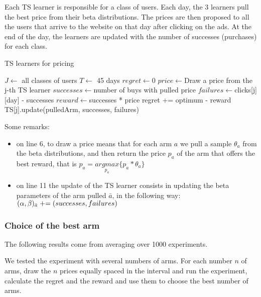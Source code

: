 Each TS learner is responsible for a class of users. Each day, the 3 learners pull the best price from their beta distributions. The prices are then proposed to all the users that arrive to the website on that day after clicking on the ads. At the end of the day, the learners are updated with the number of successes (purchases) for each class.

\begin{algorithm}
    \caption{TS learners for pricing}
    \label{alg:ts_pricing}
	\begin{algorithmic}[1]
        \STATE $J\gets ${ all classes of users}
        \STATE $T\gets ${ 45 days }
        \STATE $regret\gets ${0}
		\STATE $price\gets ${Draw a price from the j-th TS learner}
        \STATE $successes\gets ${number of buys with pulled price}
        \STATE $failures\gets ${clicks[j][day] - successes}
        \STATE $reward\gets ${successes * price}
        \STATE regret += optimum - reward
        \STATE TS[j].update(pulledArm, successes, failures)
        \ENDFOR
        \ENDFOR
	\end{algorithmic}
\end{algorithm}

Some remarks:
\begin{itemize}
    \item on line 6, to draw a price means that for each arm $a$ we pull a sample $\theta_a$ from the beta distributions, and then return the price $p_a$ of the arm that offers the best reward, that is $p_a = \underset{p_a}{argmax} \{p_a * \theta_a\}$
    \item on line 11 the update of the TS learner consists in updating the beta parameters of the arm pulled $\bar{a}$, in the following way: $(\alpha, \beta)_{\bar{a}} \mathrel{+}= (successes, failures)$
\end{itemize}

\subsubsection{Choice of the best arm}
The following results come from averaging over 1000 experiments.

We tested the experiment with several numbers of arms. For each number $n$ of arms, draw the $n$ prices equally spaced in the interval and run the experiment, calculate the regret and the reward and use them to choose the best number of arms.


